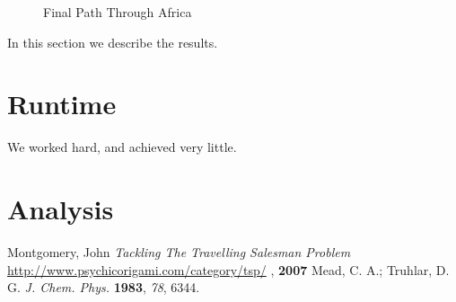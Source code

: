 \documentclass[12pt]{article}
\begin{document}
\begin{figure}
\begin{center}
\setlength\fboxsep{1.00pt}
\setlength\fboxrule{1.00pt}
\caption{Final Path Through Africa}
\end{center}
\end{figure}

In this section we describe the results.

\section{Runtime}
We worked hard, and achieved very little.

\section{Analysis}
\begin{thebibliography}{99}
 Montgomery, John {\it Tackling The Travelling Salesman Problem}{\href{http://www.psychicorigami.com/category/tsp/}{ http://www.psychicorigami.com/category/tsp/} }, {\bf 2007}
 Mead, C. A.; Truhlar, D. G. {\it J. Chem. Phys.} {\bf 1983}, {\it 78}, 6344.
\end{thebibliography}
\end{document}
